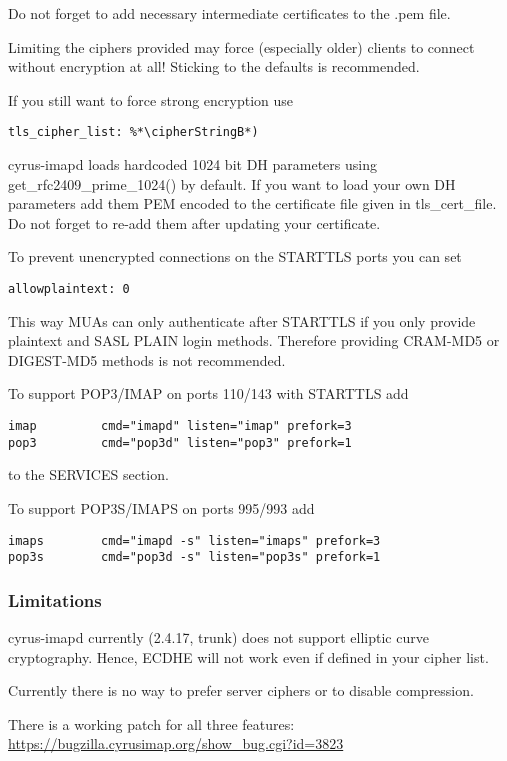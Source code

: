 Do not forget to add necessary intermediate certificates to the .pem file.

Limiting the ciphers provided may force (especially older) clients to connect without encryption at all! Sticking to the defaults is recommended.

If you still want to force strong encryption use
\begin{lstlisting}
tls_cipher_list: %*\cipherStringB*)
\end{lstlisting}

cyrus-imapd loads hardcoded 1024 bit DH parameters using get\_rfc2409\_prime\_1024() by default. If you want to load your own DH parameters add them PEM encoded to the certificate file given in tls\_cert\_file. Do not forget to re-add them after updating your certificate.

To prevent unencrypted connections on the STARTTLS ports you can set
\begin{lstlisting}
allowplaintext: 0
\end{lstlisting}
This way MUAs can only authenticate after STARTTLS if you only provide plaintext and SASL PLAIN login methods. Therefore providing CRAM-MD5 or DIGEST-MD5 methods is not recommended.

To support POP3/IMAP on ports 110/143 with STARTTLS add
\begin{lstlisting}
imap         cmd="imapd" listen="imap" prefork=3
pop3         cmd="pop3d" listen="pop3" prefork=1
\end{lstlisting}
to the SERVICES section.

To support POP3S/IMAPS on ports 995/993 add
\begin{lstlisting}
imaps        cmd="imapd -s" listen="imaps" prefork=3
pop3s        cmd="pop3d -s" listen="pop3s" prefork=1
\end{lstlisting}


\subsubsection{Limitations}
cyrus-imapd currently (2.4.17, trunk) does not support elliptic curve cryptography. Hence, ECDHE will not work even if defined in your cipher list.

Currently there is no way to prefer server ciphers or to disable compression.

There is a working patch for all three features:
\url{https://bugzilla.cyrusimap.org/show_bug.cgi?id=3823}

